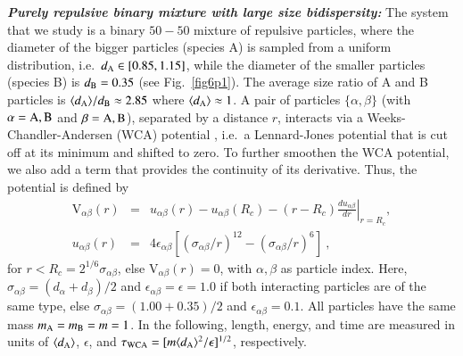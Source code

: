 {\bf \em Purely repulsive binary mixture with large size bidispersity:} The system that we study \cite{horbach2009} is a binary $50-50$ mixture of repulsive particles, where the diameter of the bigger particles (species A) is sampled from a uniform distribution, i.e.~$d_{\rm A} \in [0.85,1.15]$, while the diameter of the smaller particles (species B) is $d_{\rm B} = 0.35$ (see Fig.~\ref{fig6p1}). The average size ratio of A and B particles is $\langle d_{\rm A}\rangle/d_{\rm B} \approx 2.85$ where $\langle d_{\rm A}\rangle \approx 1$. A pair of particles $\{\alpha,\beta\}$ (with $\alpha = {\rm A, B}$ and $\beta = {\rm A, B}$), separated by a distance $r$, interacts via a Weeks-Chandler-Andersen (WCA) potential \cite{weeks1971}, i.e.~a Lennard-Jones potential that is cut off at its minimum and shifted to zero. To further smoothen the WCA potential, we also add a term that provides the continuity of its derivative. Thus, the potential is defined by 
%
\begin{eqnarray}
\textrm{V}_{\alpha\beta}(r) &=& u_{\alpha\beta}(r)-u_{\alpha\beta}(R_{c})-\left(r-R_{c}\right)\left.  \frac{du_{\alpha\beta}}{dr}\right|_{r=R_{c}},\nonumber\\
u_{\alpha\beta}(r) &=& 4\epsilon_{\alpha\beta}\left[\left(\sigma_{\alpha\beta}/r\right)^{12}- \left(\sigma_{\alpha\beta}/r\right)^{6}\right]\: ,
\end{eqnarray}
%
for $r<R_{c} = 2^{1/6} \sigma_{\alpha\beta}$, else $\textrm{V}_{\alpha\beta}(r) = 0$, with $\alpha, \beta$ as particle index. Here, $\sigma_{\alpha\beta} = (d_{\alpha}+d_{\beta})/2$ and $\epsilon_{\alpha\beta} = \epsilon = 1.0$ if both interacting particles are of the same type, else $\sigma_{\alpha\beta} = (1.00+0.35)/2$ and $\epsilon_{\alpha\beta} = 0.1$.  All particles have the same mass $m_{\rm A} = m_{\rm B} = m = 1$.  In the following, length, energy, and time are measured in units of $\langle d_{\rm A} \rangle$, $\epsilon$, and $\tau_{\rm WCA} = [m \langle d_{\rm A} \rangle ^2/\epsilon]^{1/2}$, respectively.

